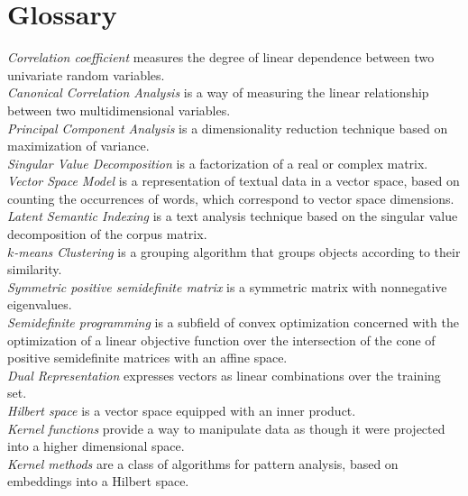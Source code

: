 %
\chapter{Glossary}

\emph{Correlation coefficient} measures the degree of linear dependence between two univariate random variables.\\
\emph{Canonical Correlation Analysis} is a way of measuring the linear relationship between two multidimensional variables.\\
\emph{Principal Component Analysis} is a dimensionality reduction technique based on maximization of variance.\\
\emph{Singular Value Decomposition} is a factorization of a real or complex matrix.\\
\emph{Vector Space Model} is a representation of textual data in a vector space, based on counting the occurrences of words, which correspond
to vector space dimensions.\\
\emph{Latent Semantic Indexing} is a text analysis technique based on the singular value decomposition of the corpus matrix.\\
\emph{$k$-means Clustering} is a grouping algorithm that groups objects according to their similarity.\\
\emph{Symmetric positive semidefinite matrix} is a symmetric matrix with nonnegative eigenvalues.\\
\emph{Semidefinite programming} is a subfield of convex optimization concerned with the optimization of a linear objective function over the intersection of the cone of positive semidefinite matrices with an affine space.\\
\emph{Dual Representation} expresses vectors as linear combinations over the training set.\\
\emph{Hilbert space} is a vector space equipped with an inner product.\\
\emph{Kernel functions} provide a way to manipulate data as though it were projected into a higher dimensional space.\\
\emph{Kernel methods} are a class of algorithms for pattern analysis, based on embeddings into a Hilbert space.\\
